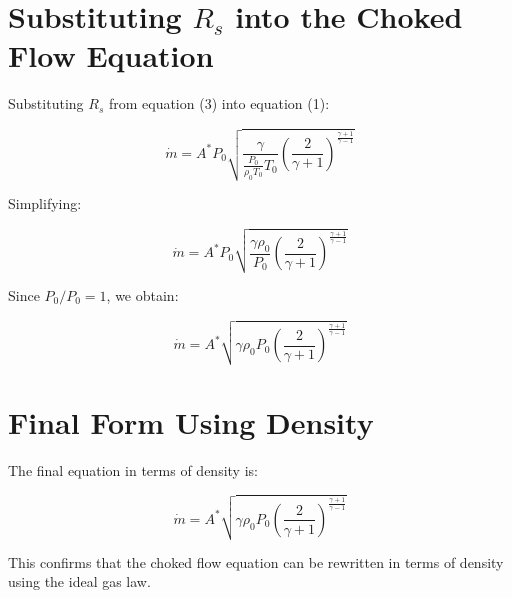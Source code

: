 \documentclass{article}
\begin{document}
\section{Substituting \( R_s \) into the Choked Flow Equation}

Substituting \( R_s \) from equation (3) into equation (1):

\begin{equation}
\dot{m} = A^* P_0 \sqrt{\frac{\gamma}{\frac{P_0}{\rho_0 T_0} T_0} \left( \frac{2}{\gamma+1} \right)^{\frac{\gamma+1}{\gamma-1}}}
\end{equation}

Simplifying:

\begin{equation}
\dot{m} = A^* P_0 \sqrt{\frac{\gamma \rho_0}{P_0} \left( \frac{2}{\gamma+1} \right)^{\frac{\gamma+1}{\gamma-1}}}
\end{equation}

Since \( P_0 / P_0 = 1 \), we obtain:

\begin{equation}
\dot{m} = A^* \sqrt{\gamma \rho_0 P_0 \left( \frac{2}{\gamma+1} \right)^{\frac{\gamma+1}{\gamma-1}}}
\end{equation}

\section{Final Form Using Density}

The final equation in terms of density is:

\begin{equation}
\dot{m} = A^* \sqrt{\gamma \rho_0 P_0 \left( \frac{2}{\gamma+1} \right)^{\frac{\gamma+1}{\gamma-1}}}
\end{equation}

This confirms that the choked flow equation can be rewritten in terms of density using the ideal gas law.
\end{document}
